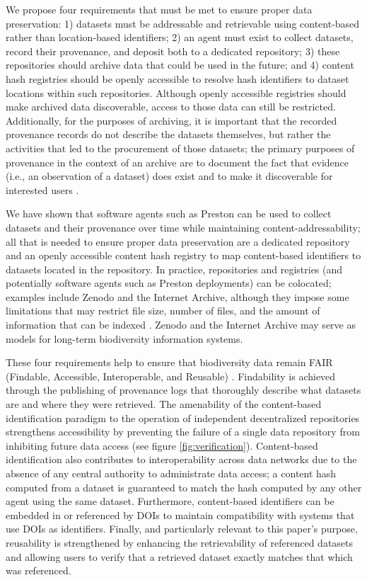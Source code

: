 We propose four requirements that must be met to ensure proper data preservation: 1) datasets must be addressable and retrievable using content-based rather than location-based identifiers; 2) an agent must exist to collect datasets, record their provenance, and deposit both to a dedicated repository; 3) these repositories should archive data that could be used in the future; and 4) content hash registries should be openly accessible to resolve hash identifiers to dataset locations within such repositories. Although openly accessible registries should make archived data discoverable, access to those data can still be restricted. Additionally, for the purposes of archiving, it is important that the recorded provenance records do not describe the datasets themselves, but rather the activities that led to the procurement of those datasets; the primary purposes of provenance in the context of an archive are to document the fact that evidence (i.e., an observation of a dataset) does exist and to make it discoverable for interested users \citep{Bearman_1995}.

We have shown that software agents such as Preston can be used to collect datasets and their provenance over time while maintaining content-addressability; all that is needed to ensure proper data preservation are a dedicated repository and an openly accessible content hash registry to map content-based identifiers to datasets located in the repository. In practice, repositories and registries (and potentially software agents such as Preston deployments) can be colocated; examples include Zenodo and the Internet Archive, although they impose some limitations that may restrict file size, number of files, and the amount of information that can be indexed \citep{zenodo_2019,archive_2019}. Zenodo and the Internet Archive may serve as models for long-term biodiversity information systems. 

These four requirements help to ensure that biodiversity data remain FAIR (Findable, Accessible, Interoperable, and Reusable) \citep{Wilkinson_2016}. Findability is achieved through the publishing of provenance logs that thoroughly describe what datasets are and where they were retrieved. The amenability of the content-based identification paradigm to the operation of independent decentralized repositories strengthens accessibility by preventing the failure of a single data repository from inhibiting future data access (see figure \ref{fig:verification}). Content-based identification also contributes to interoperability across data networks due to the absence of any central authority to administrate data access; a content hash computed from a dataset is guaranteed to match the hash computed by any other agent using the same dataset. Furthermore, content-based identifiers can be embedded in or referenced by DOIs to maintain compatibility with systems that use DOIs as identifiers. Finally, and particularly relevant to this paper's purpose, reusability is strengthened by enhancing the retrievability of referenced datasets and allowing users to verify that a retrieved dataset exactly matches that which was referenced.

